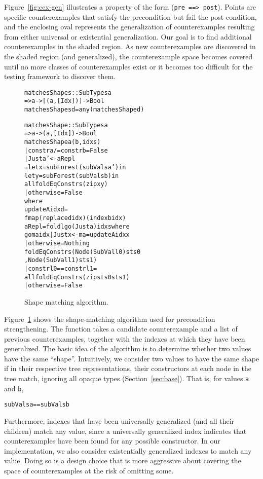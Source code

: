 \documentclass{sigplanconf}
\newenvironment{code}{\begin{alltt}}{\end{alltt}}
\newcommand{\ttp}[1]{\texttt{#1}}
\begin{document}
Figure~\ref{fig:cex-gen} illustrates a property of the form (\ttp{pre ==>
  post}).  Points are specific counterexamples that satisfy the precondition but
fail the post-condition, and the enclosing oval represents the generalization of
counterexamples resulting from either universal or existential generalization.
Our goal is to find additional counterexamples in the shaded region.  As new
counterexamples are discovered in the shaded region (and generalized), the
counterexample space becomes covered until no more classes of counterexamples
exist or it becomes too difficult for the testing framework to discover them.

\begin{figure}
  \begin{code}
matchesShapes :: SubTypes a
  => a -> [(a,[Idx])] -> Bool
matchesShapes d = any (matchesShape d)

matchesShape :: SubTypes a
  => a -> (a, [Idx]) -> Bool
matchesShape a (b, idxs)
  | constr a /= constr b = False
  | Just a' <- aRepl
  = let x = subForest (subVals a') in
    let y = subForest (subVals b)  in
    all foldEqConstrs (zip x y)
  | otherwise = False
  where
  updateA idx d =
    fmap (replace d idx) (index b idx)
  aRepl = foldl go (Just a) idxs where
    go ma idx | Just x <- ma = updateA idx x
              | otherwise    = Nothing
  foldEqConstrs ( Node (SubVal l0) sts0
                , Node (SubVal l1) sts1 )
    | constr l0 == constr l1 =
      all foldEqConstrs (zip sts0 sts1)
    | otherwise              = False
  \end{code}
  \caption{Shape matching algorithm.}
  \label{fig:matches}
\end{figure}

Figure~\ref{fig:matches} shows the shape-matching algorithm used for precondition
strengthening.  The function takes a candidate counterexample and a list of
previous counterexamples, together with the indexes at which they have been
generalized.  The basic idea of the algorithm is to determine whether two values
have the same ``shape''.  Intuitively, we consider two values to have the same
shape if in their respective tree representations, their constructors at each
node in the tree match, ignoring all opaque types (Section~\ref{sec:base}).
That is, for values \ttp{a} and \ttp{b},
%
\begin{code}
subVals a == subVals b
\end{code}
%
\noindent
Furthermore, indexes that have been universally generalized (and all their
children) match any value, since a universally generalized index indicates that
counterexamples have been found for any possible constructor.  In our
implementation, we also consider existentially generalized indexes to match any
value.  Doing so is a design choice that is more aggressive about covering the
space of counterexamples at the risk of omitting some.
\end{document}
